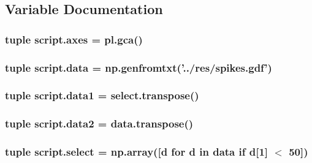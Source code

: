 \subsection{Variable Documentation}
\hypertarget{namespacescript_a14f6cfd960d8e7b5e7518604e661c3f4}{
\subsubsection[{axes}]{\setlength{\rightskip}{0pt plus 5cm}tuple script.\-axes = pl.\-gca()}}\label{namespacescript_a14f6cfd960d8e7b5e7518604e661c3f4}
\hypertarget{namespacescript_a90bc184d1f00ebc30a749662dc49f24b}{
\subsubsection[{data}]{\setlength{\rightskip}{0pt plus 5cm}tuple script.\-data = np.\-genfromtxt('../res/spikes.\-gdf')}}\label{namespacescript_a90bc184d1f00ebc30a749662dc49f24b}
\hypertarget{namespacescript_af71d9ea10b7c4687f80bf6bdaa9fdf06}{
\subsubsection[{data1}]{\setlength{\rightskip}{0pt plus 5cm}tuple script.\-data1 = select.\-transpose()}}\label{namespacescript_af71d9ea10b7c4687f80bf6bdaa9fdf06}
\hypertarget{namespacescript_a2ed92b43747ae0022d67108638b1c455}{
\subsubsection[{data2}]{\setlength{\rightskip}{0pt plus 5cm}tuple script.\-data2 = data.\-transpose()}}\label{namespacescript_a2ed92b43747ae0022d67108638b1c455}
\hypertarget{namespacescript_aac11f1a96f0432e03e3d021dc4963841}{
\subsubsection[{select}]{\setlength{\rightskip}{0pt plus 5cm}tuple script.\-select = np.\-array(\mbox{[}d for d in {\bf data} if d\mbox{[}1\mbox{]} $<$ 50\mbox{]})}}\label{namespacescript_aac11f1a96f0432e03e3d021dc4963841}
